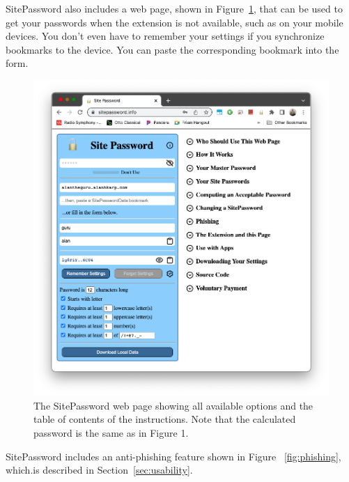 SitePassword also includes a web page, shown in Figure~\ref{fig:webpage}, that can be used to get your passwords when the extension is not available, such as on your mobile devices.  You don't even have to remember your settings if you synchronize bookmarks to the device.  You can paste the corresponding bookmark into the form.

\begin{figure}
\begin{center}
  \includegraphics[scale=0.30]{soupsfig2.png}
\end{center}
\caption{\label{fig:webpage} The SitePassword web page showing all available options and the table of contents of the instructions.  Note that the calculated password is the same as in Figure 1. }
\end{figure}

SitePassword includes an anti-phishing feature shown in Figure~ \ref{fig:phishing}, which.is described in Section~\ref{sec:usability}.
 
